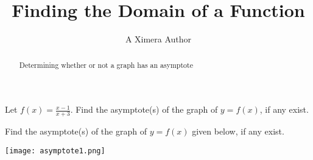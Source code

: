 \documentclass{ximera}
\title{Finding the Domain of a Function}
\author{A Ximera Author}
\begin{document}
\begin{abstract}
Determining whether or not a graph has an asymptote
\end{abstract}

\maketitle

\begin{problem}
Let $f(x) = \frac{x - 1}{x + 3}$.  Find the asymptote(s) of the graph of $y = f(x)$, if any exist.
\begin{selectAll}
\end{selectAll}
\end{problem}



\begin{problem}
Find the asymptote(s) of the graph of $y = f(x)$ given below, if any exist.
\begin{image}
\texttt{[image: asymptote1.png]}
\end{image}
\begin{selectAll}
\end{selectAll}
\end{problem}
\end{document}
